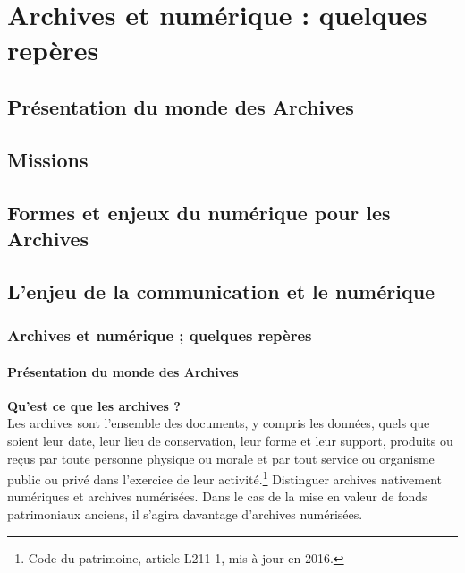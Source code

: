 \documentclass[xcolor=table]{beamer}
\begin{document}
\section{Archives et num\'erique : quelques rep\`eres}
\subsection{Pr\'esentation du monde des Archives}
\subsection{Missions}
\subsection{Formes et enjeux du num\'erique pour les Archives}
\subsection{L'enjeu de la communication et le  num\'erique}

\begin{frame}[plain]
\frametitle{Archives et num\'erique ; quelques rep\`eres}
\framesubtitle{Pr\'esentation du monde des Archives}
\textbf{Qu'est ce que les archives ?} \\
\og Les archives sont l'ensemble des documents, y compris les donn\'ees, quels que soient leur date, leur lieu de conservation, leur forme et leur support, produits ou re\c cus par toute personne physique ou morale et par tout service ou organisme public ou priv\'e dans l'exercice de leur activit\'e.\fg{}\footnote{Code du patrimoine, article L211-1, mis \`a jour en 2016.}
\newline
\newline
Distinguer archives nativement num\'eriques et archives num\'eris\'ees.
\newline
\newline
Dans le cas de la mise en valeur de fonds patrimoniaux anciens, il s'agira davantage d'archives num\'eris\'ees.
\end{frame}
\end{document}
